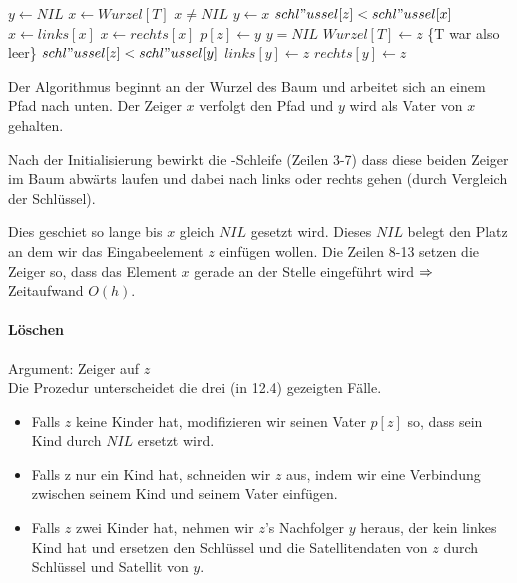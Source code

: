 \documentclass[a4paper]{scrartcl}
\begin{document}
\begin{codebox}
\li $y \gets NIL$
\li	$x \gets Wurzel[T]$
\li	\While $x \neq NIL$
\li		\Do $y \gets x$
\li			\If $schl"ussel[z] < schl"ussel[x]$
\li				\Then $x \gets links[x]$
\li				\Else $x \gets rechts[x]$
				\End
			\End
\li	$p[z] \gets y$
\li	\If $y = NIL$
\li		\Then $Wurzel[T] \gets z$
\zi			\{T war also leer\}
			\End
\li	\If $schl"ussel[z] < schl"ussel[y]$
\li		\Then $links[y] \gets z$
\li		\Else $rechts[y] \gets z$
\end{codebox}

Der Algorithmus beginnt an der Wurzel des Baum und arbeitet sich an einem Pfad nach unten. Der Zeiger $x$ verfolgt den Pfad und $y$ wird als Vater von $x$ gehalten. 

Nach der Initialisierung bewirkt die \While-Schleife (Zeilen 3-7) dass diese beiden Zeiger im Baum abwärts laufen und dabei nach links oder rechts gehen (durch Vergleich der Schlüssel).

Dies geschiet so lange bis $x$ gleich $NIL$ gesetzt wird. Dieses $NIL$ belegt den Platz an dem wir das Eingabeelement $z$ einfügen wollen. Die Zeilen 8-13 setzen die Zeiger so, dass das Element $x$ gerade an der Stelle eingeführt wird $\Rightarrow$ Zeitaufwand $O(h)$.



\paragraph{Löschen}

Argument: Zeiger auf $z$ \\
Die Prozedur unterscheidet die drei (in 12.4) gezeigten Fälle.
\begin{itemize}
\item Falls $z$ keine Kinder hat, modifizieren wir seinen Vater $p[z]$ so, dass sein Kind durch $NIL$ ersetzt wird.
\item Falls z nur ein Kind hat, schneiden wir $z$ aus, indem wir eine Verbindung zwischen seinem Kind und seinem Vater einfügen.
\item Falls $z$ zwei Kinder hat, nehmen wir $z$'s Nachfolger $y$ heraus, der kein linkes Kind hat und ersetzen den Schlüssel und
die Satellitendaten von $z$ durch Schlüssel und Satellit von $y$.
\end{itemize}
\end{document}
